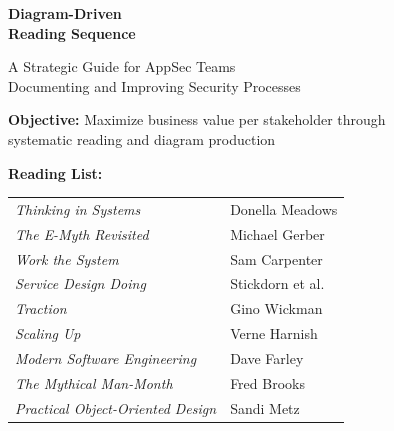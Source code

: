 \documentclass[11pt,letterpaper]{article}
\newcommand{\booktitle}[1]{\textit{#1}}
\begin{document}
\hypersetup{pageanchor=false}%
\begin{titlepage}
    \centering
    \vspace*{1.5cm}

    {\Huge\bfseries\color{primaryblue} Diagram-Driven\\[0.3cm] Reading Sequence\par}

    \vspace{0.8cm}

    {\Large\color{accentblue} A Strategic Guide for AppSec Teams\\[0.2cm]
    Documenting and Improving Security Processes\par}

    \vspace{1.5cm}

    \begin{tcolorbox}[
        colback=lightgray,
        colframe=primaryblue,
        width=0.9\textwidth,
        arc=5pt,
        boxrule=1.5pt
    ]
    \centering
    \large
    \textbf{Objective:} Maximize business value per stakeholder through\\
    systematic reading and diagram production

    \vspace{0.5cm}

    \textbf{Reading List:}\\[0.3cm]
    \begin{tabular}{ll}
    \booktitle{Thinking in Systems} & Donella Meadows \\
    \booktitle{The E-Myth Revisited} & Michael Gerber \\
    \booktitle{Work the System} & Sam Carpenter \\
    \booktitle{Service Design Doing} & Stickdorn et al. \\
    \booktitle{Traction} & Gino Wickman \\
    \booktitle{Scaling Up} & Verne Harnish \\
    \booktitle{Modern Software Engineering} & Dave Farley \\
    \booktitle{The Mythical Man-Month} & Fred Brooks \\
    \booktitle{Practical Object-Oriented Design} & Sandi Metz \\
    \end{tabular}
    \end{tcolorbox}


\end{titlepage}
\end{document}
